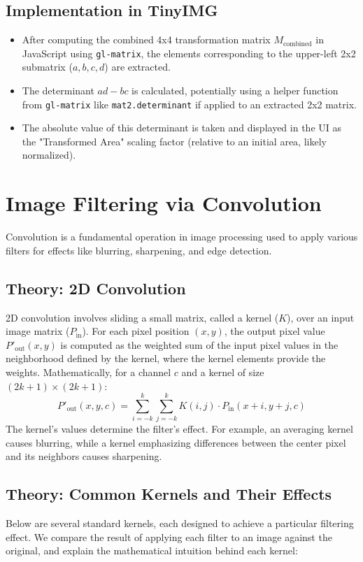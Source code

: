 \documentclass{article}
\begin{document}
\subsection{Implementation in TinyIMG}
\begin{itemize}
    \item After computing the combined 4x4 transformation matrix $M_{\text{combined}}$ in JavaScript using \texttt{gl-matrix}, the elements corresponding to the upper-left 2x2 submatrix ($a, b, c, d$) are extracted.
    \item The determinant $ad-bc$ is calculated, potentially using a helper function from \texttt{gl-matrix} like \texttt{mat2.determinant} if applied to an extracted 2x2 matrix.
    \item The absolute value of this determinant is taken and displayed in the UI as the "Transformed Area" scaling factor (relative to an initial area, likely normalized).
\end{itemize}

\section{Image Filtering via Convolution}
\label{sec:filtering}
Convolution is a fundamental operation in image processing used to apply various filters for effects like blurring, sharpening, and edge detection.

\subsection{Theory: 2D Convolution}
2D convolution involves sliding a small matrix, called a kernel ($K$), over an input image matrix ($P_{\text{in}}$). For each pixel position $(x, y)$, the output pixel value $P'_{\text{out}}(x, y)$ is computed as the weighted sum of the input pixel values in the neighborhood defined by the kernel, where the kernel elements provide the weights. Mathematically, for a channel $c$ and a kernel of size $(2k+1) \times (2k+1)$:
$$ P'_{\text{out}}(x, y, c) = \sum_{i=-k}^{k} \sum_{j=-k}^{k} K(i, j) \cdot P_{\text{in}}(x+i, y+j, c) $$
The kernel's values determine the filter's effect. For example, an averaging kernel causes blurring, while a kernel emphasizing differences between the center pixel and its neighbors causes sharpening.

\subsection{Theory: Common Kernels and Their Effects}
Below are several standard kernels, each designed to achieve a particular filtering effect. We compare the result of applying each filter to an image against the original, and explain the mathematical intuition behind each kernel:
\end{document}
